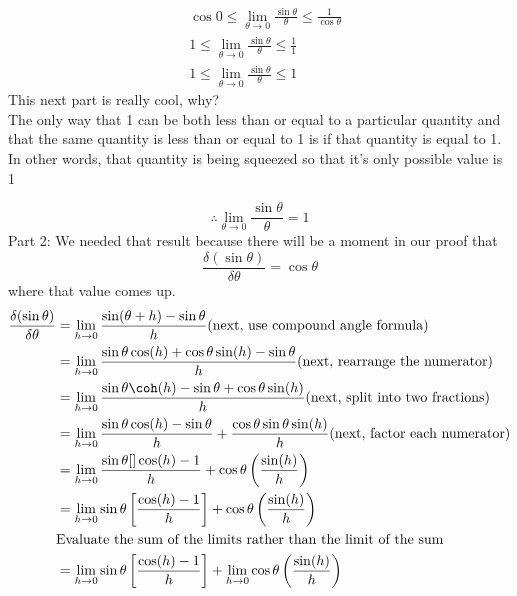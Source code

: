 \documentclass{article}
\begin{document}
\begin{align*}
   & \cos 0 \leq \lim_{\theta \to 0} \frac{\sin \theta}{\theta} \leq \frac{1}{\cos \theta}\\
   & 1 \leq \lim_{\theta \to 0} \frac{\sin \theta}{\theta} \leq \frac{1}{1}\\
   & 1 \leq \lim_{\theta \to 0} \frac{\sin \theta}{\theta} \leq 1
\end{align*}
This next part is really cool, why?\\
The only way that 1 can be both less than or equal to a particular quantity and that the same quantity is less than or equal to 1 is if that quantity is equal to 1.\\
In other words, that quantity is being squeezed so that it’s only possible value is 1

$$\therefore \lim_{\theta \to 0}\frac{\sin \theta}{\theta}=1$$
Part 2:  We needed that result because there will be a moment in our proof that $$\frac{\delta(\sin \theta)}{\delta \theta}=\cos \theta$$ where that value comes up.
\begin{align*}
    \frac{\delta (\sin \theta)}{\delta \theta}&=\lim_{h \to 0}\frac{\sin(\theta+h)-\sin \theta}{h} \text{(next, use compound angle formula)}\\
    &=\lim_{h\to 0}\frac{\sin \theta \cos (h)+\cos \theta \sin(h)-\sin \theta}{h} \text{(next, rearrange the numerator)}\\
    &= \lim_{h\to 0}\frac{\sin \theta \coh (h)-\sin \theta +\cos \theta \sin(h)}{h} \text{(next, split into two fractions)}\\ 
    &=\lim_{h \to 0} \frac{\sin \theta \cos(h)-\sin \theta }{h}+\frac{\cos \theta \sin \theta \sin(h)}{h} \text{(next, factor each numerator)}\\
    &=\lim_{h \to 0} \frac{\sin \theta []\cos (h)-1}{h}+\cos \theta \left(\frac{\sin (h)}{h}\right)\\
    &=\lim_{h \to 0} \sin \theta \left[\frac{\cos (h)-1}{h}\right]+ \cos \theta \left(\frac{\sin (h)}{h}\right)\\    
    &\text{Evaluate the sum of the limits rather than the limit of the sum}\\
    &=\lim_{h \to 0} \sin \theta \left[\frac{\cos (h)-1}{h}\right]+ \lim_{h \to 0}\cos \theta \left(\frac{\sin (h)}{h}\right)\\    
\end{align*}
\end{document}
